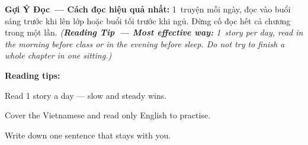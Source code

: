 \vspace{6pt}

\begin{baihoc}
\textbf{Gợi Ý Đọc~--- Cách đọc hiệu quả nhất:} 1~truyện mỗi ngày, đọc vào buổi sáng trước khi lên lớp hoặc buổi tối trước khi ngủ. Đừng cố đọc hết cả chương trong một lần.
\textit{(\textbf{Reading Tip~--- Most effective way:} 1~story per day, read in the morning before class or in the evening before sleep. Do not try to finish a whole chapter in one sitting.)}
\end{baihoc}

\vspace{4pt}

\begin{tcolorbox}[
  colback=truyenblue!6, colframe=truyenblue,
  coltitle=white, fonttitle=\bfseries,
  title={Easy English},
  arc=4pt, boxrule=1pt, breakable, enhanced
]
\textbf{Reading tips:}

Read 1 story a day --- slow and steady wins.

Cover the Vietnamese and read only English to practise.

Write down one sentence that stays with you.
\end{tcolorbox}

\ngancach

